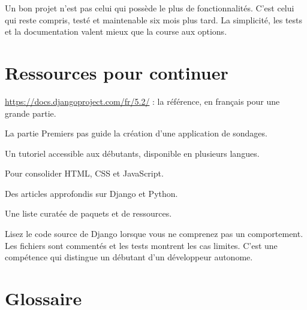 \begin{retenir}
Un bon projet n'est pas celui qui possède le plus de fonctionnalités. C'est celui
qui reste compris, testé et maintenable six mois plus tard. La simplicité, les
tests et la documentation valent mieux que la course aux options.
\end{retenir}

\section{Ressources pour continuer}

\begin{description}[leftmargin=4.3cm,style=nextline]
  \item[Documentation Django] \url{https://docs.djangoproject.com/fr/5.2/} :
  la référence, en français pour une grande partie.
  \item[Tutoriel officiel] La partie \og Premiers pas \fg{} guide la création d'une
  application de sondages.
  \item[Django Girls] Un tutoriel accessible aux débutants, disponible en
  plusieurs langues.
  \item[MDN Web Docs] Pour consolider HTML, CSS et JavaScript.
  \item[Real Python] Des articles approfondis sur Django et Python.
  \item[Awesome Django] Une liste curatée de paquets et de ressources.
\end{description}

\begin{bonne}
Lisez le code source de Django lorsque vous ne comprenez pas un comportement. Les
fichiers sont commentés et les tests montrent les cas limites. C'est une
compétence qui distingue un débutant d'un développeur autonome.
\end{bonne}

\section{Glossaire}

